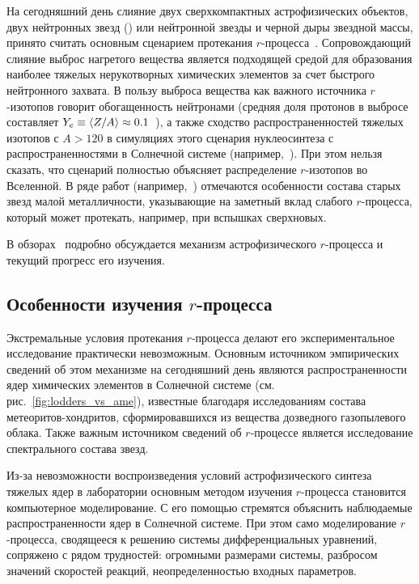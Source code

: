 На сегодняшний день слияние двух сверхкомпактных астрофизических объектов, двух нейтронных звезд (\nsm{}) или нейтронной звезды и черной дыры звездной массы, принято считать основным сценарием протекания $r$-процесса~\cite{theilemann2017}. Сопровождающий слияние выброс нагретого вещества является подходящей средой для образования наиболее тяжелых нерукотворных химических элементов за счет быстрого нейтронного захвата. В пользу выброса вещества \nsm{} как важного источника $r$-изотопов говорит обогащенность нейтронами (средняя доля протонов в выбросе составляет $Y_e \equiv \expval{Z/A} \approx 0.1$~\cite{kajino2019}), а также сходство распространенностей тяжелых изотопов с $A > 120$ в симуляциях этого сценария нуклеосинтеза с распространенностями в Солнечной системе (например,~\cite{freiberghaus1999,goriely2011}). При этом нельзя сказать, что сценарий \nsm{} полностью объясняет распределение $r$-изотопов во Вселенной. В ряде работ (например,~\cite{honda2006,qian2007,hansen2014}) отмечаются особенности состава старых звезд малой металличности, указывающие на заметный вклад слабого $r$-процесса, который может протекать, например, при вспышках сверхновых.  

В обзорах~\cite{arnould2007,kajino2019,cowan2021} подробно обсуждается механизм астрофизического $r$-процесса и текущий прогресс его изучения.

\subsection{Особенности изучения $r$-процесса}
Экстремальные условия протекания $r$-процесса делают его экспериментальное исследование практически невозможным. Основным источником эмпирических сведений об этом механизме на сегодняшний день являются распространенности ядер химических элементов в Солнечной системе (см. рис.~\ref{fig:lodders_vs_ame}), известные благодаря исследованиям состава метеоритов-хондритов, сформировавшихся из вещества дозведного газопылевого облака. Также важным источником сведений об $r$-процессе является исследование спектрального состава звезд.

Из-за невозможности воспроизведения условий астрофизического синтеза тяжелых ядер в лаборатории основным методом изучения $r$-процесса становится компьютерное моделирование. С его помощью стремятся объяснить наблюдаемые распространенности ядер в Солнечной системе. При этом само моделирование $r$-процесса, сводящееся к решению системы дифференциальных уравнений, сопряжено с рядом трудностей: огромными размерами системы, разбросом значений скоростей реакций, неопределенностью входных параметров.

